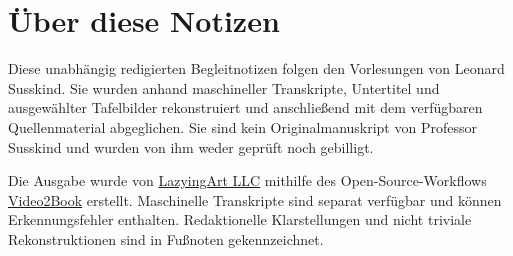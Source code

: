 \documentclass[11pt,oneside]{book}
\begin{document}
\frontmatter
\hypersetup{pageanchor=false}

\hypersetup{pageanchor=true}

\clearpage
\chapter*{Über diese Notizen}
Diese unabhängig redigierten Begleitnotizen folgen den Vorlesungen von Leonard Susskind. Sie wurden anhand maschineller Transkripte, Untertitel und ausgewählter Tafelbilder rekonstruiert und anschließend mit dem verfügbaren Quellenmaterial abgeglichen. Sie sind kein Originalmanuskript von Professor Susskind und wurden von ihm weder geprüft noch gebilligt.

Die Ausgabe wurde von \href{https://lazying.art}{LazyingArt LLC} mithilfe des Open-Source-Workflows \href{https://github.com/lachlanchen/Video2Book}{Video2Book} erstellt. Maschinelle Transkripte sind separat verfügbar und können Erkennungsfehler enthalten. Redaktionelle Klarstellungen und nicht triviale Rekonstruktionen sind in Fußnoten gekennzeichnet.
\clearpage
\tableofcontents
\mainmatter










\end{document}
